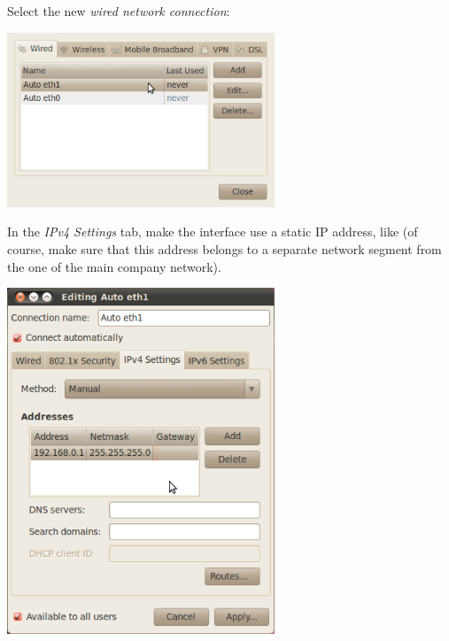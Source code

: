 Select the new {\em wired network connection}:

\begin{center}
\includegraphics[width=8cm]{labs/sysdev-u-boot/network-config-2.png}
\end{center}

In the {\em IPv4 Settings} tab, make the interface use a static IP
address, like  (of course, make sure that this
address belongs to a separate network segment from the one of the main
company network).

\begin{center}
\includegraphics[width=8cm]{labs/sysdev-u-boot/network-config-3.png}
\end{center}

